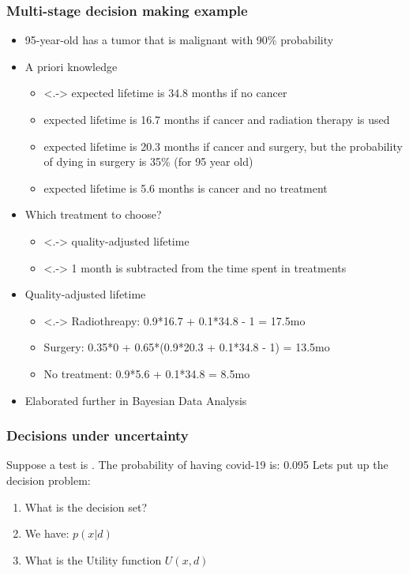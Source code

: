 \documentclass[10pt]{beamer}
\begin{document}
\begin{frame}
\frametitle{Multi-stage decision making example}

  \begin{itemize}
  \item 95-year-old has a tumor that is malignant with 90\% probability
  \item A priori knowledge
    \begin{itemize}
    \item<.-> expected lifetime is 34.8 months if no cancer
    \item<+-> expected lifetime is 16.7 months if cancer and radiation therapy is used
    \item<+-> expected lifetime is 20.3 months if cancer and surgery, but the probability of dying in surgery is 35\% (for 95 year old)
    \item<+-> expected lifetime is 5.6 months is cancer and no treatment
    \end{itemize}
  \item<+-> Which treatment to choose?
    \begin{itemize}
    \item<.-> quality-adjusted lifetime
    \item<.-> 1 month is subtracted from the time spent in treatments
    \end{itemize}
   \item<+-> Quality-adjusted lifetime
    \begin{itemize}
    \item<.-> Radiothreapy: 0.9*16.7 + 0.1*34.8 - 1 = 17.5mo
    \item<+-> Surgery: 0.35*0 + 0.65*(0.9*20.3 + 0.1*34.8 - 1) = 13.5mo
    \item<+-> No treatment: 0.9*5.6 + 0.1*34.8 = 8.5mo
    \end{itemize}
  \item<+-> Elaborated further in Bayesian Data Analysis
\end{itemize}

\end{frame}



\begin{frame}

\frametitle{Decisions under uncertainty}
  Suppose a test is . The probability of having covid-19 is: 0.095
  Lets put up the decision problem:
  \begin{enumerate}
      \item What is the decision set?
      \item We have: $p(x|d)$
      \item What is the Utility function $U(x,d)$
  \end{enumerate}
\end{frame}
\end{document}
